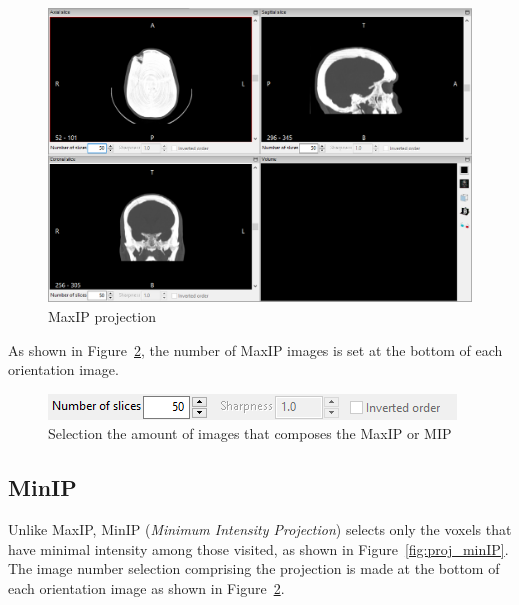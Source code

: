 \begin{figure}[!h]
\centering
\includegraphics[scale=0.40]{../user_guide_figures/invesalius_screen/multiplanar_window_maxip_en.png}
\caption{MaxIP projection}
\label{fig:proj_maxip}
\end{figure}

As shown in Figure~\ref{fig:proj_maxip_qtd}, the number of MaxIP images is set at the bottom of each orientation image.

\begin{figure}[!h]
\centering
\includegraphics[scale=0.80]{../user_guide_figures/invesalius_screen/multiplanar_window_maxip_number_en.png}
\caption{Selection the amount of images that composes the MaxIP or MIP}
\label{fig:proj_maxip_qtd}
\end{figure}

\subsection{MinIP}

Unlike MaxIP, MinIP (\textit{Minimum Intensity Projection}) selects only the voxels that have minimal intensity among those visited, as shown in Figure~\ref{fig:proj_minIP}. The image number selection comprising the projection is made at the bottom of each orientation image as shown in Figure~\ref{fig:proj_maxip_qtd}.

